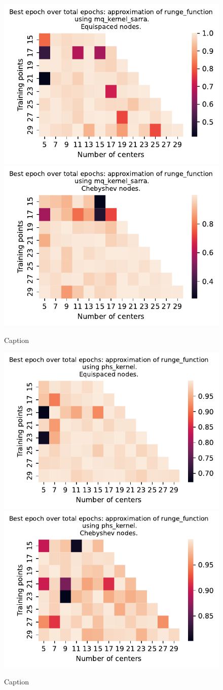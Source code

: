 \documentclass[12pt]{report} %
\begin{document}
\begin{figure}[ht]
  \centering

  \includegraphics[width=.49\textwidth]{imagenes/experiments/1d/variational_epochs/runge_function-Kmq_kernel_sarra-Equi-epochs.pdf}
  \includegraphics[width=.49\textwidth]{imagenes/experiments/1d/variational_epochs/runge_function-Kmq_kernel_sarra-Cheb-epochs.pdf}
  \caption{Caption}
  \label{fig:epochs-runge-sarra}
\end{figure}


\begin{figure}[ht]
  \centering

  \includegraphics[width=.49\textwidth]{imagenes/experiments/1d/variational_epochs/runge_function-Kphs_kernel-Equi-epochs.pdf}
  \includegraphics[width=.49\textwidth]{imagenes/experiments/1d/variational_epochs/runge_function-Kphs_kernel-Cheb-epochs.pdf}
  \caption{Caption}
  \label{fig:epochs-runge-phs}
\end{figure}
\end{document}
